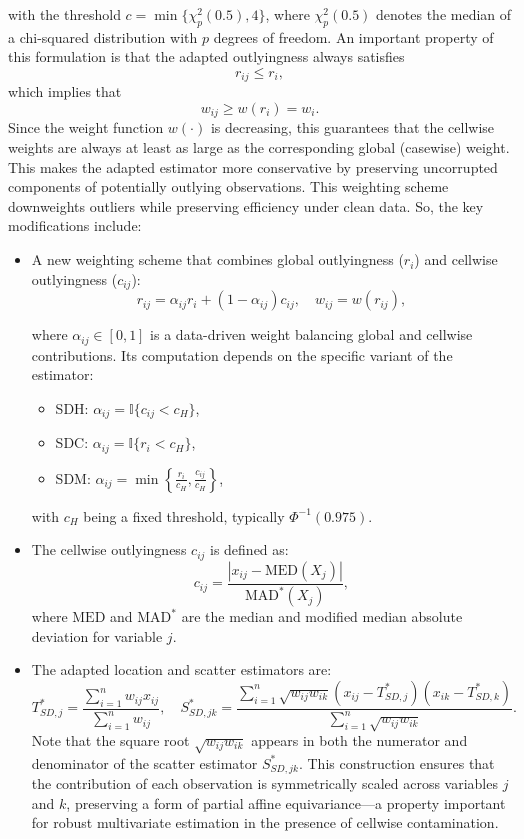 \documentclass[12pt]{article}
\begin{document}
with the threshold \( c = \min\{\chi^2_p(0.5), 4\} \), where \( \chi^2_p(0.5) \) denotes the median of a chi-squared distribution with \( p \) degrees of freedom. An important property of this formulation is that the adapted outlyingness always satisfies
\[
r_{ij} \leq r_i,
\]
which implies that
\[
w_{ij} \geq w(r_i) = w_i.
\]
Since the weight function \( w(\cdot) \) is decreasing, this guarantees that the cellwise weights are always at least as large as the corresponding global (casewise) weight. This makes the adapted estimator more conservative by preserving uncorrupted components of potentially outlying observations. This weighting scheme downweights outliers while preserving efficiency under clean data. So, the key modifications include:
\begin{itemize}
    \item A new weighting scheme that combines global outlyingness ($r_i$) and cellwise outlyingness ($c_{ij}$):
    \[
r_{ij} = \alpha_{ij} r_i + (1 - \alpha_{ij}) c_{ij}, \quad
w_{ij} = w(r_{ij}),
\]

    where \(\alpha_{ij} \in [0, 1]\) is a data-driven weight balancing global and cellwise contributions. Its computation depends on the specific variant of the estimator:
\begin{itemize}
    \item SDH: \(\alpha_{ij} = \mathbb{I}\{ c_{ij} < c_H \}\),
    \item SDC: \(\alpha_{ij} = \mathbb{I}\{ r_i < c_H \}\),
    \item SDM: \(\alpha_{ij} = \min\left\{ \frac{r_i}{c_H}, \frac{c_{ij}}{c_H} \right\}\),
\end{itemize}
with \(c_H\) being a fixed threshold, typically \( \Phi^{-1}(0.975) \).


    \item The cellwise outlyingness $c_{ij}$ is defined as:
    \[
    c_{ij} = \frac{|x_{ij} - \text{MED}(X_j)|}{\text{MAD}^*(X_j)},
    \]
    where $\text{MED}$ and $\text{MAD}^*$ are the median and modified median absolute deviation for variable $j$.

    \item The adapted location and scatter estimators are:
    \[
    T^*_{SD,j} = \frac{\sum_{i=1}^n w_{ij} x_{ij}}{\sum_{i=1}^n w_{ij}}, \quad
    S^*_{SD,jk} = \frac{\sum_{i=1}^n \sqrt{w_{ij} w_{ik}} (x_{ij} - T^*_{SD,j})(x_{ik} - T^*_{SD,k})}{\sum_{i=1}^n \sqrt{w_{ij} w_{ik}}}.
    \]
    Note that the square root \( \sqrt{w_{ij} w_{ik}} \) appears in both the numerator and denominator of the scatter estimator \( S^*_{SD,jk} \).  
    This construction ensures that the contribution of each observation is symmetrically scaled across variables \( j \) and \( k \), preserving a form of partial affine equivariance—a property important for robust multivariate estimation in the presence of cellwise contamination.
\end{itemize}
\\
\end{document}

